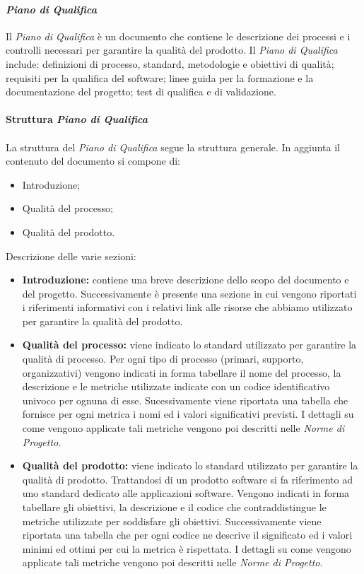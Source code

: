 \paragraph{\textit{Piano di Qualifica}}
Il \textit{Piano di Qualifica} è un documento che contiene le descrizione dei processi e i controlli necessari per garantire la qualità del prodotto. 
Il \textit{Piano di Qualifica} include: definizioni di processo, standard, metodologie e obiettivi di qualità; requisiti per la 
qualifica del software; linee guida per la formazione e la documentazione del progetto; test di qualifica e di validazione.
\\\\
\textbf{Struttura \textit{Piano di Qualifica}}
\\\\
La struttura del \textit{Piano di Qualifica} segue la struttura generale.
In aggiunta il contenuto del documento si compone di:
\begin{itemize}
    \item Introduzione;
    \item Qualità del processo;
    \item Qualità del prodotto.
\end{itemize}
\noindent Descrizione delle varie sezioni:
\begin{itemize}
\item \textbf{Introduzione:} contiene una breve descrizione dello scopo del documento e del progetto.
Successivamente è presente una sezione in cui vengono riportati i riferimenti informativi 
con i relativi link alle risorse che abbiamo utilizzato per garantire la qualità del prodotto.

\item \textbf{Qualità del processo:} viene indicato lo standard utilizzato per garantire la qualità di processo.
Per ogni tipo di processo (primari, supporto, organizzativi) vengono indicati in forma tabellare il nome del processo, la descrizione e le metriche utilizzate
indicate con un codice identificativo univoco per ognuna di esse.
Sucessivamente viene riportata una tabella che fornisce per ogni metrica i nomi ed i valori significativi previsti.
I dettagli su come vengono applicate tali metriche vengono poi descritti nelle \textit{Norme di Progetto}.

\item \textbf{Qualità del prodotto:} viene indicato lo standard utilizzato per garantire la qualità di prodotto.
Trattandosi di un prodotto software si fa riferimento ad uno standard dedicato alle applicazioni software.
Vengono indicati in forma tabellare gli obiettivi, la descrizione e il codice che contraddistingue le metriche utilizzate per soddisfare gli obiettivi.
Successivamente viene riportata una tabella che per ogni codice ne descrive il significato ed i valori minimi ed ottimi per cui la metrica è rispettata.
I dettagli su come vengono applicate tali metriche vengono poi descritti nelle \textit{Norme di Progetto}.
\end{itemize}